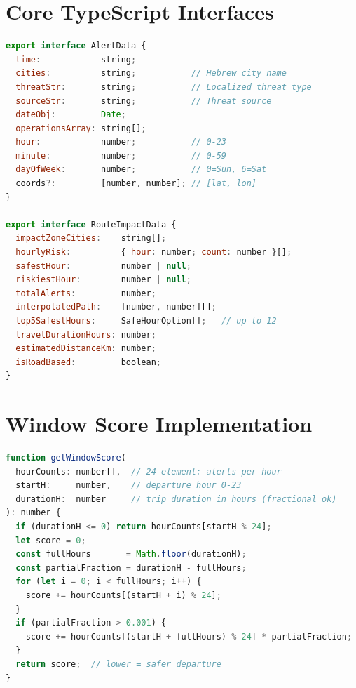 \documentclass[12pt,a4paper]{article}
\begin{document}
\section{Core TypeScript Interfaces}
\label{app:interfaces}

\begin{lstlisting}[style=tscode, language=JavaScript,
  caption={AlertData and RouteImpactData interfaces}]
export interface AlertData {
  time:            string;
  cities:          string;           // Hebrew city name
  threatStr:       string;           // Localized threat type
  sourceStr:       string;           // Threat source
  dateObj:         Date;
  operationsArray: string[];
  hour:            number;           // 0-23
  minute:          number;           // 0-59
  dayOfWeek:       number;           // 0=Sun, 6=Sat
  coords?:         [number, number]; // [lat, lon]
}

export interface RouteImpactData {
  impactZoneCities:    string[];
  hourlyRisk:          { hour: number; count: number }[];
  safestHour:          number | null;
  riskiestHour:        number | null;
  totalAlerts:         number;
  interpolatedPath:    [number, number][];
  top5SafestHours:     SafeHourOption[];   // up to 12
  travelDurationHours: number;
  estimatedDistanceKm: number;
  isRoadBased:         boolean;
}
\end{lstlisting}

\section{Window Score Implementation}
\label{app:window}

\begin{lstlisting}[style=tscode, language=JavaScript,
  caption={getWindowScore: scores a departure hour over the full travel window}]
function getWindowScore(
  hourCounts: number[],  // 24-element: alerts per hour
  startH:     number,    // departure hour 0-23
  durationH:  number     // trip duration in hours (fractional ok)
): number {
  if (durationH <= 0) return hourCounts[startH % 24];
  let score = 0;
  const fullHours       = Math.floor(durationH);
  const partialFraction = durationH - fullHours;
  for (let i = 0; i < fullHours; i++) {
    score += hourCounts[(startH + i) % 24];
  }
  if (partialFraction > 0.001) {
    score += hourCounts[(startH + fullHours) % 24] * partialFraction;
  }
  return score;  // lower = safer departure
}
\end{lstlisting}
\end{document}
